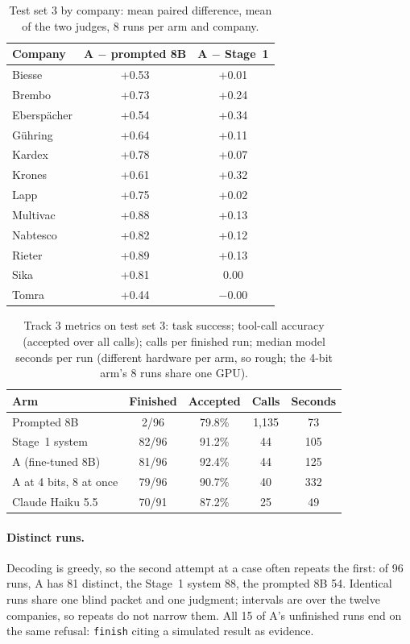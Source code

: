 \documentclass[11pt]{article}
\begin{document}
\begin{table}[h]
\centering
\small
\begin{tabular}{lcc}
\toprule
Company & A $-$ prompted 8B & A $-$ Stage~1 \\
\midrule
Biesse & +0.53 & +0.01 \\
Brembo & +0.73 & +0.24 \\
Ebersp\"acher & +0.54 & +0.34 \\
G\"uhring & +0.64 & +0.11 \\
Kardex & +0.78 & +0.07 \\
Krones & +0.61 & +0.32 \\
Lapp & +0.75 & +0.02 \\
Multivac & +0.88 & +0.13 \\
Nabtesco & +0.82 & +0.12 \\
Rieter & +0.89 & +0.13 \\
Sika & +0.81 & 0.00 \\
Tomra & +0.44 & $-$0.00 \\
\bottomrule
\end{tabular}
\caption{Test set 3 by company: mean paired difference, mean of the two judges, 8 runs per arm and company.}
\end{table}

\begin{table}[h]
\centering
\small
\setlength{\tabcolsep}{3pt}
\begin{tabular}{lcccc}
\toprule
Arm & Finished & Accepted & Calls & Seconds \\
\midrule
Prompted 8B & 2/96 & 79.8\% & 1,135 & 73 \\
Stage~1 system & 82/96 & 91.2\% & 44 & 105 \\
A (fine-tuned 8B) & 81/96 & 92.4\% & 44 & 125 \\
A at 4 bits, 8 at once & 79/96 & 90.7\% & 40 & 332 \\
Claude Haiku 5.5 & 70/91 & 87.2\% & 25 & 49 \\
\bottomrule
\end{tabular}
\caption{Track 3 metrics on test set 3: task success; tool-call accuracy (accepted over all calls); calls per finished run; median model seconds per run (different hardware per arm, so rough; the 4-bit arm's 8 runs share one GPU).}
\label{tab:track3}
\end{table}

\paragraph{Distinct runs.} Decoding is greedy, so the second attempt at a case often repeats the first: of 96 runs, A
has 81 distinct, the Stage~1 system 88, the prompted 8B 54. Identical runs share one blind packet and one judgment;
intervals are over the twelve companies, so repeats do not narrow them. All 15 of A's unfinished runs end on the same
refusal: \texttt{finish} citing a simulated result as evidence.
\end{document}
